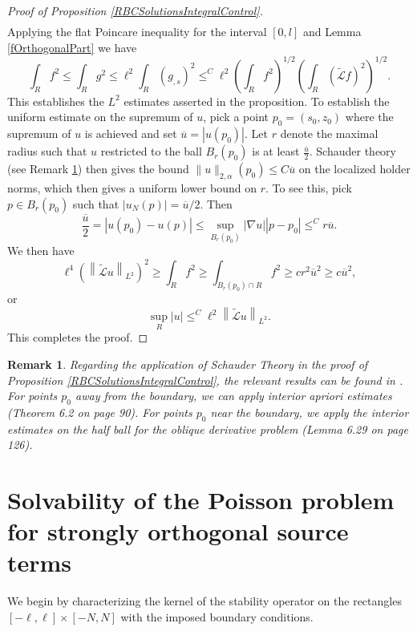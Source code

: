 \documentclass{amsart}
\newtheorem{remark}{Remark}
\newcommand{\mc}{\mathcal}
\newcommand{\wt}{\widetilde}
\newcommand{\ol}{\overline}
\begin{document}
\begin{proof}[Proof of Proposition  \ref{RBCSolutionsIntegralControl}]
\begin{align*}
\end{align*}
Applying the flat Poincare inequality for the interval $[0, l]$ and  Lemma \ref{fOrthogonalPart}  we have 
\[
\int_{R} f^2 \leq \int_{R} g^2  \leq \ell^2 \int_{R} \left(g_{, s}\right)^2  \leq^C \ell^2\left( \int_{R} f^2 \right)^{1/2}  \left( \int_{R} \left(\wt{\mc{L}}f\right)^2 \right)^{1/2}.
\]
This establishes the $L^2$ estimates asserted in the proposition.  To establish the uniform estimate on the supremum of $u$, pick a point $p_0 = (s_0, z_0)$ where the supremum of $u$ is achieved and set $\ol{u} = |u(p_0)|$. Let $r$ denote the maximal radius such that $u$ restricted to the ball $B_{r} (p_0)$ is at least $\frac{\ol{u}}{2}$. Schauder theory (see Remark \ref{Rem:SchauderTheory}) then gives the bound $\| u\|_{2, \alpha} (p_0) \leq C \ol{u}$  on the localized holder norms, which then gives a uniform lower bound  on $r$. To see this, pick $p \in B_{r} (p_0)$ such that $|u_N(p)| = \ol{u}/2$. Then 
\[
\frac{\ol{u}}{2} = \left|u (p_0) - u (p) \right| \leq \sup_{B_r(p_0)} \left| \nabla u \right||p- p_0| \leq^C r \ol{u}.
\]
We then have 
\[ 
 \ell^4 \left(\left\|\wt{\mc{L}} u \right\|_{L^2}\right)^2  \geq \int_{R} f^2 \geq \int_{B_r(p_0)  \cap R} f^2 \geq c r^2 \ol{u}^2 \geq c \ol{u}^2,
\]
or 
\[
\sup_{R} |u| \leq^C \ell^{2}\left\|\wt{\mc{L}} u \right\|_{L^2}.
\]
This completes the proof. 
\end{proof}

\begin{remark}\label{Rem:SchauderTheory}
Regarding the application of Schauder Theory  in the proof of Proposition \ref{RBCSolutionsIntegralControl}, the relevant results can be found in \cite{GT}. For points $p_0$ away from the boundary, we can apply interior apriori estimates (Theorem 6.2 on page 90). For points $p_0$ near the boundary, we apply the interior estimates on the half ball for the oblique derivative problem (Lemma 6.29 on page 126).
\end{remark}

\section{Solvability of the Poisson problem for strongly orthogonal source terms} \label{Sec:Solvability}
 
  We begin by characterizing the kernel of the stability operator on the rectangles $[-\ell, \ell] \times [-N, N]$ with the imposed boundary conditions. 
 
\end{document}
